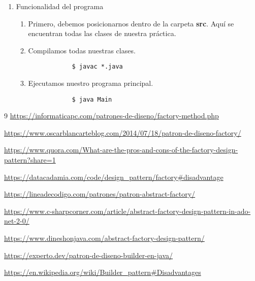 \documentclass[letterpaper,11pt]{article}
\begin{document}
\begin{enumerate}
    \item Funcionalidad del programa
    \begin{enumerate}
        \item Primero, debemos posicionarnos dentro de la carpeta \textbf{src}.
        Aquí se encuentran todas las clases de nuestra práctica.

        \item Compilamos todas nuestras clases.
        \begin{verbatim}
            $ javac *.java
        \end{verbatim}

        \item Ejecutamos nuestro programa principal.
        \begin{verbatim}
            $ java Main 
        \end{verbatim}
    \end{enumerate}
\end{enumerate}

\begin{thebibliography} {9}
    \url{https://informaticapc.com/patrones-de-diseno/factory-method.php}

    \url{https://www.oscarblancarteblog.com/2014/07/18/patron-de-diseno-factory/}

    \url{https://www.quora.com/What-are-the-pros-and-cons-of-the-factory-design-pattern?share=1}

    \url{https://datacadamia.com/code/design_pattern/factory#disadvantage}

    \url{https://lineadecodigo.com/patrones/patron-abstract-factory/}

    \url{https://www.c-sharpcorner.com/article/abstract-factory-design-pattern-in-ado-net-2-0/}

    \url{https://www.dineshonjava.com/abstract-factory-design-pattern/}

    \url{https://experto.dev/patron-de-diseno-builder-en-java/}

    \url{https://en.wikipedia.org/wiki/Builder_pattern#Disadvantages}
\end{thebibliography}
\end{document}
